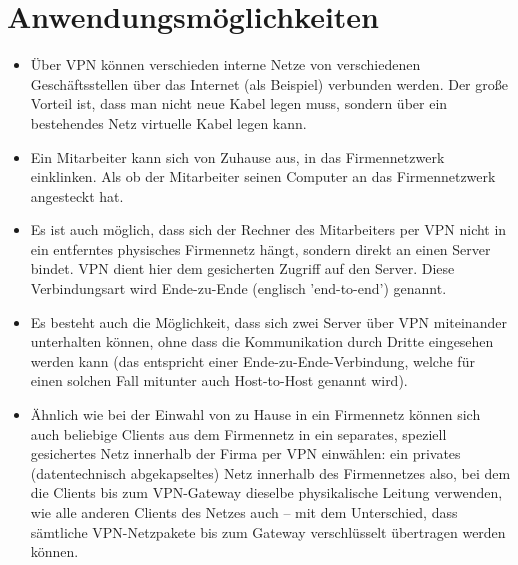 \section{Anwendungsmöglichkeiten}

\begin{itemize}
\item Über VPN können verschieden interne Netze von verschiedenen Geschäftsstellen über das Internet (als Beispiel) verbunden werden. Der große Vorteil ist, dass man nicht neue Kabel legen muss, sondern über ein bestehendes Netz virtuelle Kabel legen kann.
\item Ein Mitarbeiter kann sich von Zuhause aus, in das Firmennetzwerk einklinken. Als ob der Mitarbeiter seinen Computer an das Firmennetzwerk angesteckt hat.
\item Es ist auch möglich, dass sich der Rechner des Mitarbeiters per VPN nicht in ein entferntes physisches Firmennetz hängt, sondern direkt an einen Server bindet. VPN dient hier dem gesicherten Zugriff auf den Server. Diese Verbindungsart wird Ende-zu-Ende (englisch 'end-to-end') genannt.
\item Es besteht auch die Möglichkeit, dass sich zwei Server über VPN miteinander unterhalten können, ohne dass die Kommunikation durch Dritte eingesehen werden kann (das entspricht einer Ende-zu-Ende-Verbindung, welche für einen solchen Fall mitunter auch Host-to-Host genannt wird).
\item Ähnlich wie bei der Einwahl von zu Hause in ein Firmennetz können sich auch beliebige Clients aus dem Firmennetz in ein separates, speziell gesichertes Netz innerhalb der Firma per VPN einwählen: ein privates (datentechnisch abgekapseltes) Netz innerhalb des Firmennetzes also, bei dem die Clients bis zum VPN-Gateway dieselbe physikalische Leitung verwenden, wie alle anderen Clients des Netzes auch – mit dem Unterschied, dass sämtliche VPN-Netzpakete bis zum Gateway verschlüsselt übertragen werden können.
\end{itemize}